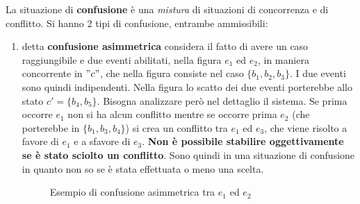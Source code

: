 \begin{definizione}
  La situazione di \textbf{confusione} è una \textit{mistura} di situazioni di
  concorrenza e di conflitto. Si hanno 2 tipi di confusione, entrambe
  ammissibili: 
  \begin{enumerate}
    \item detta \textbf{confusione asimmetrica} considera il fatto di avere un
    caso raggiungibile e due eventi abilitati, nella figura $e_1$ ed $e_2$, in
    maniera concorrente in $"c"$, che nella figura consiste nel caso
    $\{b_1, b_2, b_3\}$. I due eventi sono quindi indipendenti. Nella figura lo
    scatto dei due eventi porterebbe allo stato $c'=\{b_4, b_5\}$. Bisogna
    analizzare però nel dettaglio il sistema. Se prima occorre $e_1$ non si ha
    alcun conflitto mentre se occorre prima $e_2$ (che porterebbe in
    $\{b_1, b_3, b_4\}$) si crea un conflitto tra $e_1$ ed $e_3$, che viene
    risolto a favore di $e_1$ e a sfavore di $e_3$. \textbf{Non è possibile
      stabilire oggettivamente se è stato sciolto un conflitto}. Sono quindi in
    una situazione di confusione in quanto non so se è stata effettuata o meno
    una scelta.
    \begin{figure}[H]
      \centering
      \caption{Esempio di confusione asimmetrica tra $e_1$ ed $e_2$} 
    \end{figure}


\end{enumerate}
\end{definizione}
